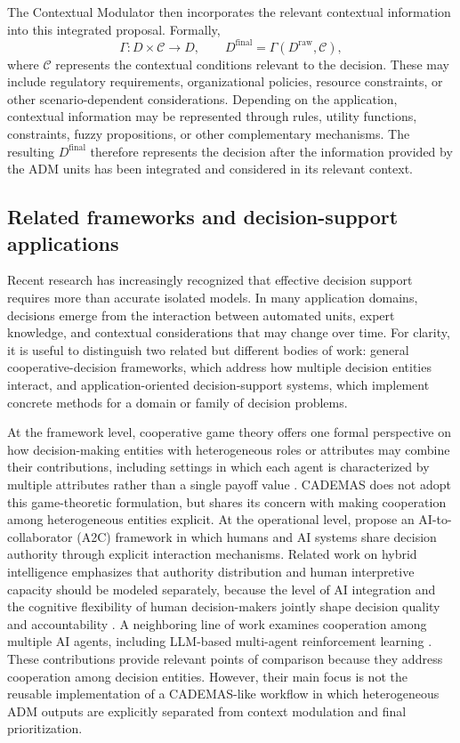 The Contextual Modulator then incorporates the relevant contextual information into this integrated proposal. Formally,
\begin{equation*}
\Gamma:D\times\mathcal{C}\rightarrow D,\qquad
D^{\mathrm{final}}=\Gamma(D^{\mathrm{raw}},\mathcal{C}),
\end{equation*}
where $\mathcal{C}$ represents the contextual conditions relevant to the decision. These may include regulatory requirements, organizational policies, resource constraints, or other scenario-dependent considerations. Depending on the application, contextual information may be represented through rules, utility functions, constraints, fuzzy propositions, or other complementary mechanisms. The resulting $D^{\mathrm{final}}$ therefore represents the decision after the information provided by the ADM units has been integrated and considered in its relevant context.

\subsection{Related frameworks and decision-support applications}\label{sec:related}

Recent research has increasingly recognized that effective decision support requires more than accurate isolated models. In many application domains, decisions emerge from the interaction between automated units, expert knowledge, and contextual considerations that may change over time. For clarity, it is useful to distinguish two related but different bodies of work: general cooperative-decision frameworks, which address how multiple decision entities interact, and application-oriented decision-support systems, which implement concrete methods for a domain or family of decision problems. 

At the framework level, cooperative game theory offers one formal perspective on how decision-making entities with heterogeneous roles or attributes may combine their contributions, including settings in which each agent is characterized by multiple attributes rather than a single payoff value \citep{Borkotokey2019}. CADEMAS does not adopt this game-theoretic formulation, but shares its concern with making cooperation among heterogeneous entities explicit. At the operational level, \citet{Tariq2024a} propose an AI-to-collaborator (A2C) framework in which humans and AI systems share decision authority through explicit interaction mechanisms. Related work on hybrid intelligence emphasizes that authority distribution and human interpretive capacity should be modeled separately, because the level of AI integration and the cognitive flexibility of human decision-makers jointly shape decision quality and accountability \citep{Deliu2026}. A neighboring line of work examines cooperation among multiple AI agents, including LLM-based multi-agent reinforcement learning \citep{Sun2024}. These contributions provide relevant points of comparison because they address cooperation among decision entities. However, their main focus is not the reusable implementation of a CADEMAS-like workflow in which heterogeneous ADM outputs are explicitly separated from context modulation and final prioritization.

